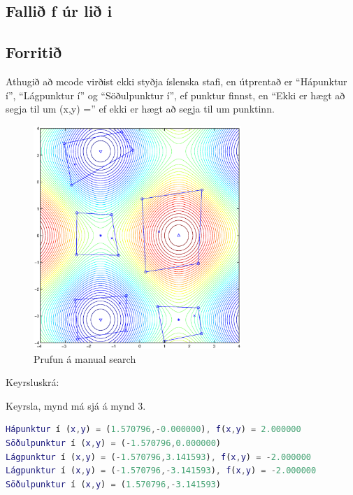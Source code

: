 \documentclass[a4]{article}
\begin{document}
\begin{flushright}
\subsection*{Fallið f úr lið i}

\subsection*{Forritið}

Athugið að mcode virðist ekki styðja íslenska stafi, en útprentað er
``Hápunktur í'', ``Lágpunktur í'' og ``Söðulpunktur í'', ef punktur finnst,
en ``Ekki er hægt að segja til um (x,y) ='' ef ekki er hægt að segja til um punktinn.\\



\begin{figure}[h!]
\centering
\includegraphics[width=0.7\textwidth]{manualdaemi1.eps}
\caption{Prufun á manual search}
\end{figure}

\newpage
Keyrsluskrá:

Keyrsla, mynd má sjá á mynd 3.
\begin{lstlisting}[language=Matlab]
Hápunktur í (x,y) = (1.570796,-0.000000), f(x,y) = 2.000000
Söðulpunktur í (x,y) = (-1.570796,0.000000)
Lágpunktur í (x,y) = (-1.570796,3.141593), f(x,y) = -2.000000
Lágpunktur í (x,y) = (-1.570796,-3.141593), f(x,y) = -2.000000
Söðulpunktur í (x,y) = (1.570796,-3.141593)
\end{lstlisting}



\end{flushright}
\end{document}
